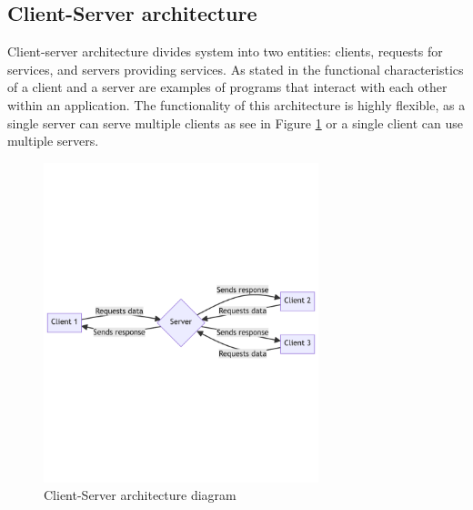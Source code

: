

\subsection{Client-Server architecture}
Client-server architecture divides system into two entities: clients, requests for services, and servers providing services.
As stated in \cite{mediumArchitectureComparison} the functional characteristics of a client and a server are examples of programs that interact with each other within an application. The functionality of this architecture is highly flexible, as a single server can serve multiple clients as see in Figure \ref{img03:client_server_architecture_diagram} or a single client can use multiple servers.
\begin{figure}[H]\centering
\includegraphics[width=80mm]{img/chap03/fig_client_server_architecture_mermaid.png}
\caption{Client-Server architecture diagram}
\label{img03:client_server_architecture_diagram}
\end{figure}


   

